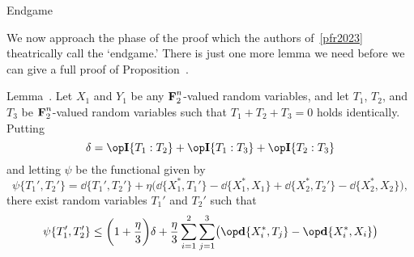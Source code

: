 \advsect Endgame

We now approach the phase of the proof which the authors of~\ref{pfr2023} theatrically call the `endgame.'
There is just one more lemma we need before we can give a full proof of Proposition~{\propmaintau}.

\edef\lemseventwo{\the\sectcount.\the\thmcount}
\proclaim Lemma~\advthm. Let $X_1$ and $Y_1$ be any $\hbox{\bf F}_2^n$-valued random variables,
and let $T_1$, $T_2$, and $T_3$ be $\hbox{\bf F}_2^n$-valued random variables
such that $T_1 + T_2 + T_3 = 0$ holds identically. Putting
$$\delta = \II\{T_1 : T_2\} + \II\{T_1:T_3\} + \II\{T_2 : T_3\}$$
and letting $\psi$ be the functional given by
$$\psi\{T_1', T_2'\}
= \dd\{T_1', T_2'\} + \eta\bigl( \dd\{X_1^*,T_1'\}-\dd\{X_1^*,X_1\}+\dd\{X_2^*,T_2'\}-\dd\{X_2^*, X_2\}\bigr),$$
there exist random variables $T_1'$ and $T_2'$ such that
$$\psi\{T_1', T_2'\} \le \biggl(1+{\eta\over 3}\biggr)\delta
+ {\eta\over 3}\sum_{i=1}^2\sum_{j=1}^3 \bigl(\dd\{X_i^*, T_j\}-\dd\{X_i^*, X_i\}\bigr)$$

